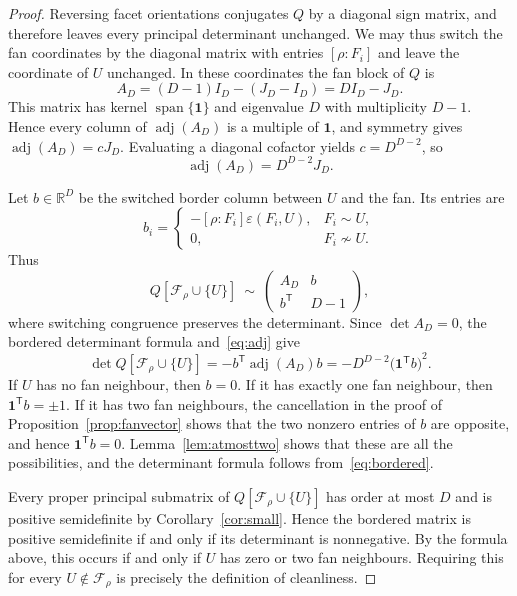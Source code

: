 \documentclass[11pt,reqno]{amsart}
\numberwithin{equation}{section}
\theoremstyle{plain}
\theoremstyle{definition}
\newcommand{\R}{\mathbb{R}}
\newcommand{\eps}{\varepsilon}
\newcommand{\ones}{\mathbf{1}}
\newcommand{\T}{\mathsf{T}}
\newcommand{\Fset}{\mathcal F}
\DeclareMathOperator{\spn}{span}
\DeclareMathOperator{\adj}{adj}
\begin{document}
\begin{proof}
Reversing facet orientations conjugates $Q$ by a diagonal sign matrix, and therefore leaves
every principal determinant unchanged. We may thus switch the fan coordinates by the diagonal
matrix with entries $[\rho:F_i]$ and leave the coordinate of $U$ unchanged. In these coordinates
the fan block of $Q$ is
\[
  A_D=(D-1)I_D-(J_D-I_D)=D I_D-J_D.
\]
This matrix has kernel $\spn\{\ones\}$ and eigenvalue $D$ with multiplicity $D-1$. Hence every
column of $\adj(A_D)$ is a multiple of $\ones$, and symmetry gives $\adj(A_D)=cJ_D$. Evaluating
a diagonal cofactor yields $c=D^{D-2}$, so
\begin{equation}\label{eq:adj}
  \adj(A_D)=D^{D-2}J_D .
\end{equation}

Let $b\in\R^D$ be the switched border column between $U$ and the fan. Its entries are
\[
  b_i=\begin{cases}
    -[\rho:F_i]\eps(F_i,U), & F_i\sim U,\\
    0, & F_i\not\sim U.
  \end{cases}
\]
Thus
\[
  Q[\Fset_\rho\cup\{U\}]\ \sim\ \begin{pmatrix}A_D & b\\ b^{\T} & D-1\end{pmatrix},
\]
where switching congruence preserves the determinant. Since $\det A_D=0$, the bordered
determinant formula and~\eqref{eq:adj} give
\begin{equation}\label{eq:bordered}
  \det Q[\Fset_\rho\cup\{U\}]=-b^{\T}\adj(A_D)b=-D^{D-2}{\bigl(\ones^{\T}b\bigr)}^{2} .
\end{equation}
If $U$ has no fan neighbour, then $b=0$. If it has exactly one fan neighbour, then
$\ones^{\T}b=\pm1$. If it has two fan neighbours, the cancellation in the proof of
Proposition~\ref{prop:fanvector} shows that the two nonzero entries of $b$ are opposite, and
hence $\ones^{\T}b=0$. Lemma~\ref{lem:atmosttwo} shows that these are all the possibilities,
and the determinant formula follows from~\eqref{eq:bordered}.

Every proper principal submatrix of $Q[\Fset_\rho\cup\{U\}]$ has order at most $D$ and is
positive semidefinite by Corollary~\ref{cor:small}. Hence the bordered matrix is positive
semidefinite if and only if its determinant is nonnegative. By the formula above, this occurs
if and only if $U$ has zero or two fan neighbours. Requiring this for every
$U\notin\Fset_\rho$ is precisely the definition of cleanliness.
\end{proof}
\end{document}
